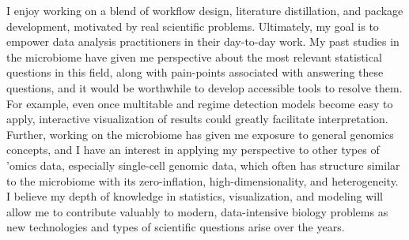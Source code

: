 \documentclass{article}
\begin{document}
I enjoy working on a blend of workflow design, literature distillation, and
package development, motivated by real scientific problems. Ultimately, my goal
is to empower data analysis practitioners in their day-to-day work. My past
studies in the microbiome have given me perspective about the most relevant
statistical questions in this field, along with pain-points associated with
answering these questions, and it would be worthwhile to develop accessible
tools to resolve them. For example, even once multitable and regime detection
models become easy to apply, interactive visualization of results could greatly
facilitate interpretation. Further, working on the microbiome has given me
exposure to general genomics concepts, and I have an interest in applying my
perspective to other types of 'omics data, especially single-cell genomic data,
which often has structure similar to the microbiome with its zero-inflation,
high-dimensionality, and heterogeneity. I believe my depth of knowledge in
statistics, visualization, and modeling will allow me to contribute valuably to
modern, data-intensive biology problems as new technologies and types of
scientific questions arise over the years.



\end{document}
